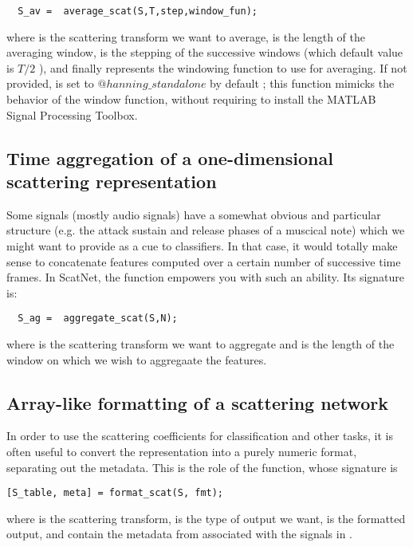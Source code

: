 \documentclass{article}
\begin{document}
\begin{lstlisting}
  S_av =  average_scat(S,T,step,window_fun);
\end{lstlisting}

where  is the scattering transform we want to average,  is the length of the averaging window,  is the stepping of the successive 
windows (which default value is $T/2$ ), and finally  represents the windowing function to use for averaging. If not provided,  is set to  $@hanning\_standalone$ by default ; this function mimicks the behavior of the  window function, without requiring to install the MATLAB Signal Processing Toolbox. 

\subsection{Time aggregation of a one-dimensional scattering representation}

Some signals (mostly audio signals) have a somewhat obvious and particular structure (e.g. the attack sustain and release phases of a muscical note) which we might want 
to provide as a cue to classifiers. In that case, it would totally make sense to concatenate features computed over a certain number of successive time frames. In ScatNet,
the function  empowers you with such an ability. Its  signature is:

\begin{lstlisting}
  S_ag =  aggregate_scat(S,N);
\end{lstlisting}
where  is the scattering transform we want to aggregate and  is the length of the window on which we wish to aggregaate the features.

\subsection{Array-like formatting of a scattering network}

In order to use the scattering coefficients for classification and other tasks, it is often useful to convert the representation into a purely numeric format, separating 
out the metadata. This is the role of the  function, whose signature is
\begin{lstlisting}
[S_table, meta] = format_scat(S, fmt);
\end{lstlisting}
where  is the scattering transform,  is the type of output we want,  is the formatted output, and  contain the metadata 
from  associated with the signals in .
\end{document}
